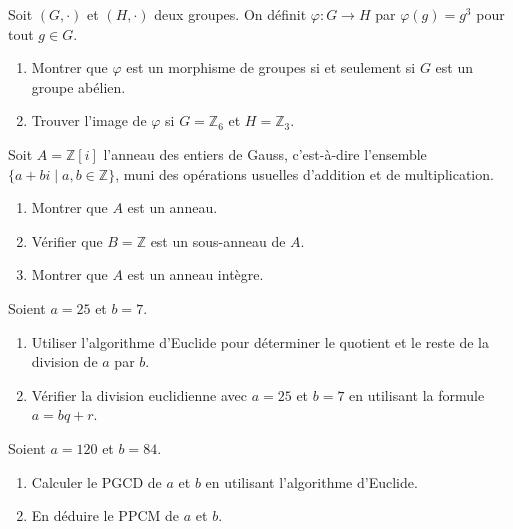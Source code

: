 \begin{exercice}
Soit \( (G, \cdot) \) et \( (H, \cdot) \) deux groupes. On définit \( \varphi : G \to H \) par \( \varphi(g) = g^3 \) pour tout \( g \in G \).
\begin{enumerate}
    \item Montrer que \( \varphi \) est un morphisme de groupes si et seulement si \( G \) est un groupe abélien.
    \item Trouver l'image de \( \varphi \) si \( G = \mathbb{Z}_6 \) et \( H = \mathbb{Z}_3 \).
\end{enumerate}
\end{exercice}

\begin{exercice}
Soit \( A = \mathbb{Z}[i] \) l'anneau des entiers de Gauss, c'est-à-dire l'ensemble \( \{a + bi \mid a, b \in \mathbb{Z}\} \), muni des opérations usuelles d'addition et de multiplication.
\begin{enumerate}
    \item Montrer que \( A \) est un anneau.
    \item Vérifier que \( B = \mathbb{Z} \) est un sous-anneau de \( A \).
    \item Montrer que \( A \) est un anneau intègre.
\end{enumerate}
\end{exercice}

\begin{exercice}
Soient \( a = 25 \) et \( b = 7 \).
\begin{enumerate}
    \item Utiliser l'algorithme d'Euclide pour déterminer le quotient et le reste de la division de \( a \) par \( b \).
    \item Vérifier la division euclidienne avec \( a = 25 \) et \( b = 7 \) en utilisant la formule \( a = bq + r \).
\end{enumerate}
\end{exercice}

\begin{exercice}
Soient \( a = 120 \) et \( b = 84 \).
\begin{enumerate}
    \item Calculer le PGCD de \( a \) et \( b \) en utilisant l'algorithme d'Euclide.
    \item En déduire le PPCM de \( a \) et \( b \).
\end{enumerate}
\end{exercice}

